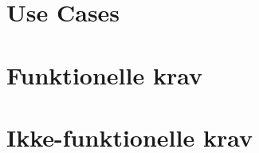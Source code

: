 \section{Use Cases}


\clearpage

\section{Funktionelle krav}


\section{Ikke-funktionelle krav}

\clearpage

%